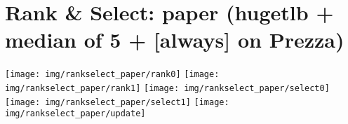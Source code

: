 \documentclass{article}
\begin{document}
\section*{Rank \& Select: paper (hugetlb + median of 5 + [always] on Prezza)}

\begin{center}
\texttt{[image: img/rankselect\_paper/rank0]}
\texttt{[image: img/rankselect\_paper/rank1]}
\texttt{[image: img/rankselect\_paper/select0]}
\texttt{[image: img/rankselect\_paper/select1]}
\texttt{[image: img/rankselect\_paper/update]}
\end{center}
\end{document}
